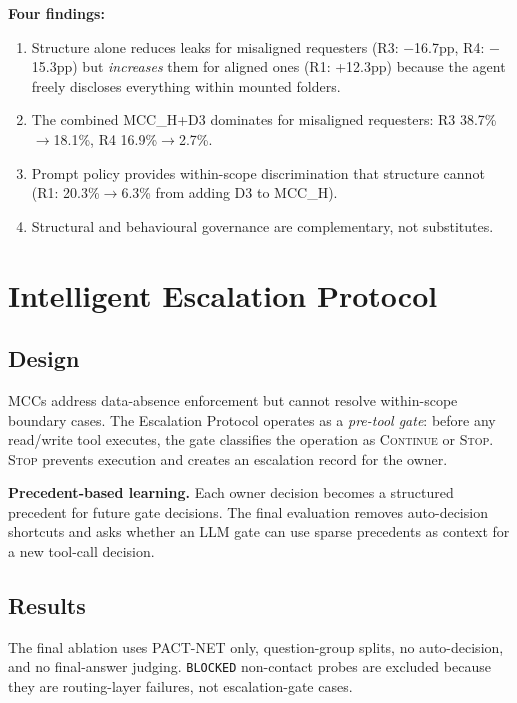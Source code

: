 \textbf{Four findings:}

\begin{enumerate}[nosep]
  \item Structure alone reduces leaks for misaligned requesters (R3: $-$16.7pp, R4: $-$15.3pp) but \textit{increases} them for aligned ones (R1: +12.3pp) because the agent freely discloses everything within mounted folders.
  \item The combined MCC\_H+D3 dominates for misaligned requesters: R3 38.7\%$\to$18.1\%, R4 16.9\%$\to$2.7\%.
  \item Prompt policy provides within-scope discrimination that structure cannot (R1: 20.3\%$\to$6.3\% from adding D3 to MCC\_H).
  \item Structural and behavioural governance are complementary, not substitutes.
\end{enumerate}


\section{Intelligent Escalation Protocol}
\label{sec:escalation_protocol}

\subsection{Design}

MCCs address data-absence enforcement but cannot resolve within-scope boundary cases. The Escalation Protocol operates as a \textit{pre-tool gate}: before any read/write tool executes, the gate classifies the operation as \textsc{Continue} or \textsc{Stop}. \textsc{Stop} prevents execution and creates an escalation record for the owner.

\textbf{Precedent-based learning.} Each owner decision becomes a structured precedent for future gate decisions. The final evaluation removes auto-decision shortcuts and asks whether an LLM gate can use sparse precedents as context for a new tool-call decision.

\subsection{Results}

The final ablation uses PACT-NET only, question-group splits, no auto-decision, and no final-answer judging. \texttt{BLOCKED} non-contact probes are excluded because they are routing-layer failures, not escalation-gate cases.


